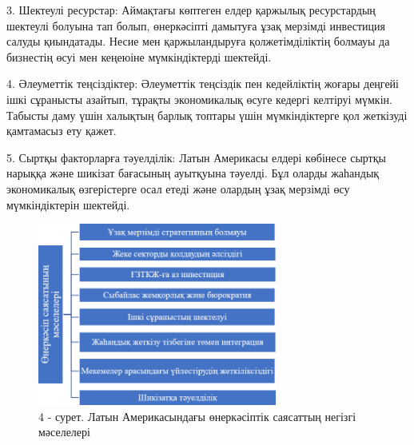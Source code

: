 \begin{multicols}{2}
3. Шектеулі ресурстар: Аймақтағы көптеген елдер қаржылық ресурстардың
шектеулі болуына тап болып, өнеркәсіпті дамытуға ұзақ мерзімді
инвестиция салуды қиындатады. Несие мен қаржыландыруға қолжетімділіктің
болмауы да бизнестің өсуі мен кеңеюіне мүмкіндіктерді шектейді.

4. Әлеуметтік теңсіздіктер: Әлеуметтік теңсіздік пен кедейліктің жоғары
деңгейі ішкі сұранысты азайтып, тұрақты экономикалық өсуге кедергі
келтіруі мүмкін. Табысты даму үшін халықтың барлық топтары үшін
мүмкіндіктерге қол жеткізуді қамтамасыз ету қажет.

5. Сыртқы факторларға тәуелділік: Латын Америкасы елдері көбінесе сыртқы
нарыққа және шикізат бағасының ауытқуына тәуелді. Бұл оларды жаһандық
экономикалық өзгерістерге осал етеді және олардың ұзақ мерзімді өсу
мүмкіндіктерін шектейді.
\end{multicols}

\begin{figure}[H]
	\centering
	\includegraphics[width=0.7\textwidth]{media/ekon4/image23}
	\caption*{4 - сурет. Латын Америкасындағы өнеркәсіптік саясаттың негізгі мәселелері}
\end{figure}

